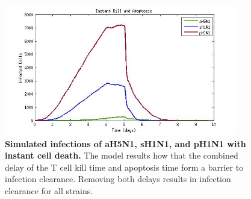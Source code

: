 \documentclass[preprint,10pt,numbers]{elsarticle}
\begin{document}
\begin{figure}[!ht]
\begin{center}
\includegraphics[width=4in]{Figure_7}
 \end{center}
\caption{{\bf Simulated infections of aH5N1, sH1N1, and pH1N1 with instant cell death.} The model results how that the combined delay of the T cell kill time and apoptosis time form a barrier to infection clearance.  Removing both delays results in infection clearance for all strains.}
 \label{fig:instantkill}
\end{figure}
\end{document}
